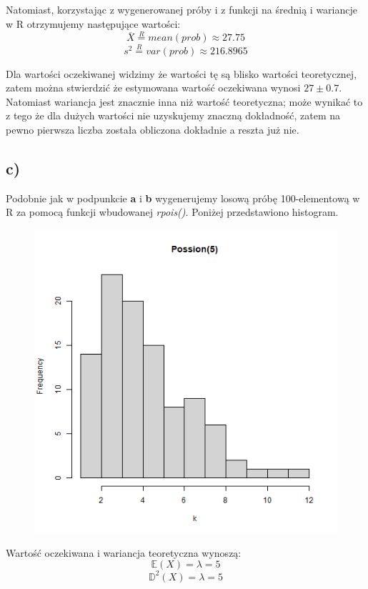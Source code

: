 \documentclass{article}
\begin{document}
Natomiast, korzystając z wygenerowanej próby i z funkcji na średnią i wariancje w R otrzymujemy następujące wartości:
\[ \overline{X} \overset{R}{=} mean(prob) \approx 27.75 \]
\[ s^2 \overset{R}{=} var(prob) \approx 216.8965 \]

Dla wartości oczekiwanej widzimy że wartości tę są blisko wartości teoretycznej, zatem można stwierdzić że estymowana wartość oczekiwana wynosi $27 \pm 0.7$. Natomiast wariancja jest znacznie inna niż wartość teoretyczna; może wynikać to z tego że dla dużych wartości nie uzyskujemy znaczną dokładność, zatem na pewno pierwsza liczba została obliczona dokładnie a reszta już nie.

\subsection{c)}
Podobnie jak w podpunkcie \textbf{a} i \textbf{b} wygenerujemy losową próbę 100-elementową w R za pomocą funkcji wbudowanej \textit{rpois()}. Poniżej przedstawiono histogram.
\begin{figure}[h!]
\begin{center}
\includegraphics[height = 0.5\textheight, angle = 0]{"lab7zad6_c.png"}
\end{center}
\end{figure}

Wartość oczekiwana i wariancja teoretyczna wynoszą:
\[ \mathbb{E}(X) = \lambda = 5 \]
\[ \mathbb{D}^2(X) = \lambda = 5 \]
\end{document}
